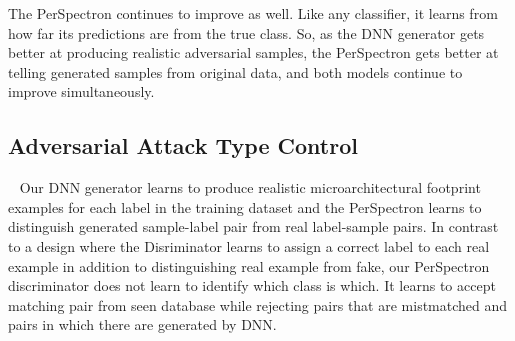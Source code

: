 The PerSpectron continues to improve as well. Like any classifier, it learns from how far its predictions are from the true class. 
So, as the DNN generator gets better at producing realistic adversarial samples, the PerSpectron gets better at telling generated samples from original data, and both models continue to improve simultaneously. 







 




\subsection{Adversarial Attack Type Control}~\label{TypeControl}
 Our DNN generator learns to produce realistic microarchitectural footprint examples for each label in the training dataset and the PerSpectron learns to distinguish generated sample-label pair from real label-sample pairs.   
 In contrast to a design where the Disriminator learns to assign a correct label to each real example in addition to distinguishing real example from fake, our PerSpectron discriminator does not learn to identify which class is which.  It learns to accept matching pair from seen database while rejecting pairs that are mistmatched and pairs in which there are generated by DNN. 
 
